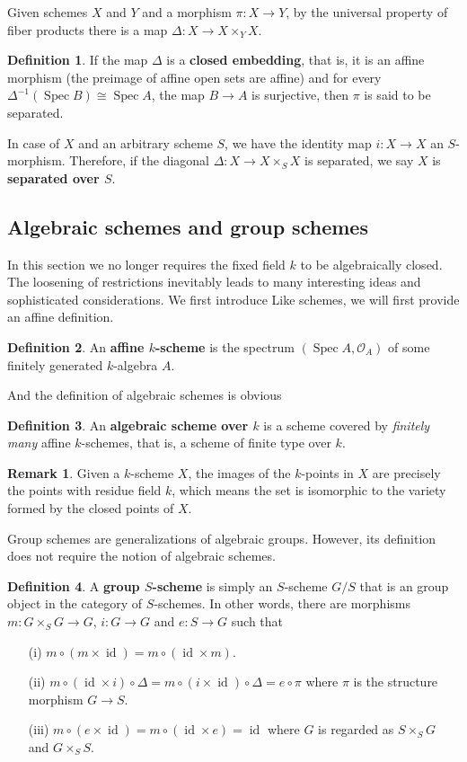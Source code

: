 \documentclass[12pt]{article}
\theoremstyle{remark}
\theoremstyle{definition}
\newtheorem{remark}{Remark}[section]
\newtheorem{definition}{Definition}[section]
\newcommand{\D}[0]{\Delta}
\newcommand{\Spec}[0]{\operatorname{Spec}}
\newcommand{\id}[0]{\operatorname{id}}
\begin{document}
    Given schemes $X$ and $Y$ and a morphism $\pi:X\to Y$, by the universal property of fiber products there is a map $\D:X\to X\times_Y X$.
    \begin{definition}
        If the map $\D$ is a \textbf{closed embedding}, that is, it is an affine morphism (the preimage of affine open sets are affine) and for every $\D^{-1}(\Spec B)\cong \Spec A$, the map $B\to A$ is surjective, then $\pi$ is said to be separated.

        In case of $X$ and an arbitrary scheme $S$, we have the identity map $i:X\to X$ an $S$-morphism. Therefore, if the diagonal $\D:X\to X\times_S X$ is separated, we say $X$ is \textbf{separated over $S$}.
    \end{definition}
    
    \subsection{Algebraic schemes and group schemes}
    In this section we no longer requires the fixed field $k$ to be algebraically closed. The loosening of restrictions inevitably leads to many interesting ideas and sophisticated considerations. We first introduce 
    Like schemes, we will first provide an affine definition.
    \begin{definition}
        An \textbf{affine $k$-scheme} is the spectrum $(\Spec A, \mathcal O_A)$ of some finitely generated $k$-algebra $A$.
    \end{definition}
    And the definition of algebraic schemes is obvious
    \begin{definition}
        An \textbf{algebraic scheme over $k$} is a scheme covered by \textit{finitely many} affine $k$-schemes, that is, a scheme of finite type over $k$.
    \end{definition}
    \begin{remark}
        Given a $k$-scheme $X$, the images of the $k$-points in $X$ are precisely the points with residue field $k$, which means the set is isomorphic to the variety formed by the closed points of $X$.
    \end{remark}
    Group schemes are generalizations of algebraic groups. However, its definition does not require the notion of algebraic schemes.
    \begin{definition}
        A \textbf{group $S$-scheme} is simply an $S$-scheme $G/S$ that is an group object in the category of $S$-schemes. In other words, there are morphisms $m:G\times_S G\to G$, $i:G\to G$ and $e:S\to G$ such that
        \begin{enumerate}
            \item[(i)] $m\circ (m\times \id)=m\circ(\id\times m)$.
            \item[(ii)] $m\circ (\id\times i)\circ\D=m\circ (i\times \id)\circ\D=e\circ\pi$ where $\pi$ is the structure morphism $G\to S$.
            \item[(iii)] $m\circ(e\times \id)=m\circ(\id\times e)=\id$ where $G$ is regarded as $S\times_S G$ and $G\times_S S$.
        \end{enumerate}
    \end{definition}
\end{document}
